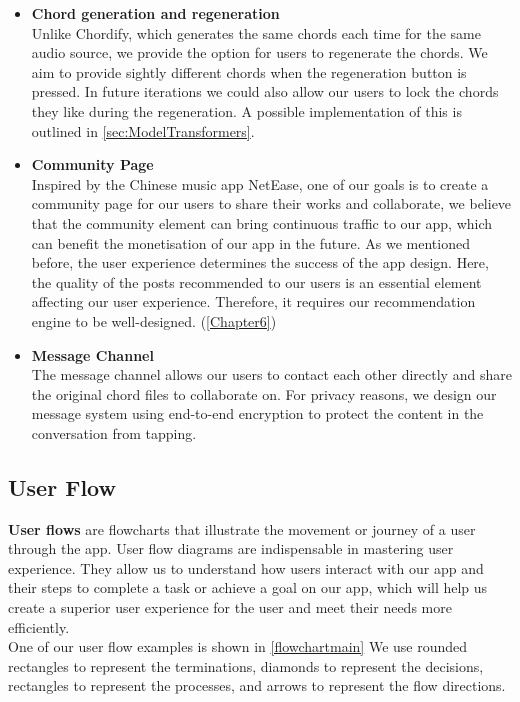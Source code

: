 \begin{itemize}
\item \textbf{Chord generation and regeneration}
\\Unlike Chordify, which generates the same chords each time for the same audio source, we provide the option for users to regenerate the chords. We aim to provide sightly different chords when the regeneration button is pressed. 
In future iterations we could also allow our users to lock the chords they like during the regeneration. A possible implementation of this is outlined in \cref{sec:ModelTransformers}.

\item \textbf{Community Page}
\\Inspired by the Chinese music app NetEase, one of our goals is to create a community page for our users to share their works and collaborate, 
we believe that the community element can bring continuous traffic to our app, which can benefit the monetisation of our app in the future.
As we mentioned before, the user experience determines the success of the app design. Here, the quality of the posts recommended to our users is an essential element affecting our user experience. 
Therefore, it requires our recommendation engine to be well-designed. (\cref{Chapter6})

\item \textbf{Message Channel}
\\The message channel allows our users to contact each other directly and share the original chord files to collaborate on. For privacy reasons, we design our message system using end-to-end encryption to protect the content in the conversation from tapping.

\end{itemize}

\subsection{User Flow}
 \textbf{User flows} are flowcharts that illustrate the movement or journey of a user through the app. User flow diagrams are indispensable in mastering user experience. 
 They allow us to understand how users interact with our app and their steps to complete a task or achieve a goal on our app, 
 which will help us create a superior user experience for the user and meet their needs more efficiently. 
 \\One of our user flow examples is shown in \cref{flowchartmain}
 We use rounded rectangles to represent the terminations, diamonds to represent the decisions, rectangles to represent the processes, and arrows to represent the flow directions.

